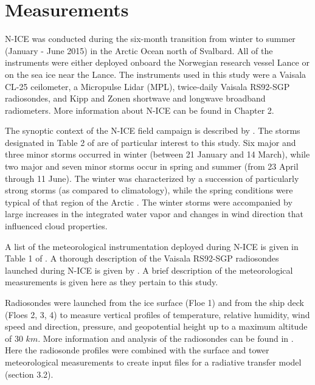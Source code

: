 \section{Measurements}
N-ICE was conducted during the six-month transition from winter to summer (January - June 2015) in the Arctic Ocean north of Svalbard. All of the instruments were either deployed onboard the Norwegian research vessel Lance or on the sea ice near the Lance. The instruments used in this study were a Vaisala CL-25 ceilometer, a Micropulse Lidar (MPL), twice-daily Vaisala RS92-SGP radiosondes, and Kipp and Zonen shortwave and longwave broadband radiometers. More information about N-ICE can be found in Chapter 2. 

The synoptic context of the N-ICE field campaign is described by \citet{cohen:2017}. The storms designated in Table 2 of \citet{cohen:2017} are of particular interest to this study. Six major and three minor storms occurred in winter (between 21 January and 14 March), while two major and seven minor storms occur in spring and summer (from 23 April through 11 June). The winter was characterized by a succession of particularly strong storms (as compared to climatology), while the spring conditions were typical of that region of the Arctic \citep{graham:2017}. The winter storms were accompanied by large increases in the integrated water vapor and changes in wind direction \citep{kayser:2017} that influenced cloud properties.

A list of the meteorological instrumentation deployed during N-ICE is given in Table 1 of \citet{cohen:2017}. A thorough description of the Vaisala RS92-SGP radiosondes launched during N-ICE is given by \citet{kayser:2017}. A brief description of the meteorological measurements is given here as they pertain to this study.

Radiosondes were launched from the ice surface (Floe 1) and from the ship deck (Floes 2, 3, 4) to measure vertical profiles of temperature, relative humidity, wind speed and direction, pressure, and geopotential height up to a maximum altitude of 30 $km$. More information and analysis of the radiosondes can be found in \citep{kayser:2017}. Here the radiosonde profiles were combined with the surface and tower meteorological measurements to create input files for a radiative transfer model (section 3.2).

